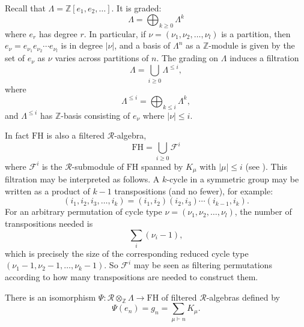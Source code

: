 \documentclass[ALCO,Unicode]{cedram}
\newcommand{\FH}{\mathrm{FH}}
\newcommand{\FH}{\mathrm{FH}}
\begin{document}
Recall that $\Lambda = \mathbb{Z}[e_1, e_2, \ldots]$. It is graded:
\[
\Lambda = \bigoplus_{k \geq 0} \Lambda^k
\]
where $e_r$ has degree $r$. In particular, if $\nu = (\nu_1, \nu_2, \ldots, \nu_l)$ is a partition, then $e_\nu = e_{\nu_1} e_{\nu_2} \cdots e_{\nu_l}$ is in degree $|\nu|$, and a basis of $\Lambda^n$ as a $\mathbb{Z}$-module is given by the set of $e_\nu$ as $\nu$ varies across partitions of $n$. The grading on $\Lambda$ induces a filtration 
\[
\Lambda = \bigcup_{i \geq 0} \Lambda^{\leq i},
\]
where
\[
\Lambda^{\leq i} = \bigoplus_{k \leq i} \Lambda^k,
\]
and $\Lambda^{\leq i}$ has $\mathbb{Z}$-basis consisting of $e_\nu$ where $|\nu| \leq i$.

In fact $\FH$ is also a filtered $\mathcal{R}$-algebra,
\[
\FH = \bigcup_{i \geq 0} \mathcal{F}^i
\]
where $\mathcal{F}^i$ is the $\mathcal{R}$-submodule of $\FH$ spanned by $K_\mu$ with $|\mu| \leq i$ (see  \cite[Lemma 3.9]{FarahatHigman}). This filtration may be interpreted as follows. A $k$-cycle in a symmetric group may be written as a product of $k-1$ transpositions (and no fewer), for example:
\[
(i_1, i_2, i_3, \ldots, i_k) = (i_1, i_2)(i_2, i_3)\cdots(i_{k-1},i_k).
\]
For an arbitrary permutation of cycle type $\nu = (\nu_1, \nu_2, \ldots, \nu_l)$, the number of transpositions needed is
\[
\sum_i (\nu_i - 1),
\]
which is precisely the size of the corresponding reduced cycle type $(\nu_1-1, \nu_2-1, \ldots, \nu_k-1)$. So $\mathcal{F}^i$ may be seen as filtering permutations according to how many transpositions are needed to construct them.

\begin{theorem} \label{thm:FH_lambda_iso}
There is an isomorphism $\Psi: \mathcal{R} \otimes_{\mathbb{Z}} \Lambda \to \FH$ of filtered $\mathcal{R}$-algebras defined by
\[
\Psi(e_n) = g_n = \sum_{\mu \vdash n} K_\mu.
\]
\end{theorem}
\end{document}
